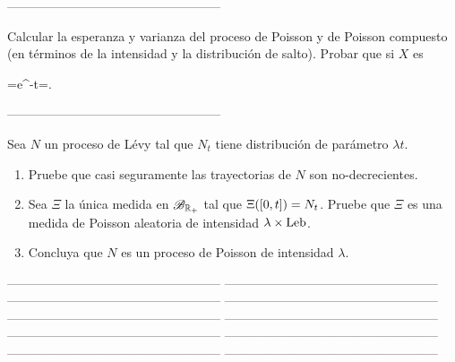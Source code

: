 \pn---------------------------------------------------\pn
\begin{ejercicio}
Calcular la esperanza y varianza del proceso de Poisson y de Poisson compuesto (en t\'erminos de la intensidad y la distribuci\'on de salto). Probar que si $X$ es\begin{esn}
=e^{-\lambda t}\quad{}\quad {}=. 
\end{esn}
\end{ejercicio}
\pn---------------------------------------------------\pn
\begin{ejercicio}
Sea $N$ un proceso de L\'evy tal que $N_t$ tiene distribuci\'on de par\'ametro $\lambda t$. 
\begin{enumerate}
\item Pruebe que casi seguramente las trayectorias de $N$ son no-decrecientes.
\item Sea $\Xi$ la \'unica medida en $\mathscr{B}_{\mathbb{R}_+}$ tal que $\Xi\!\left( [0,t]\right) =N_t$. Pruebe que $\Xi$ es una medida de Poisson aleatoria de intensidad $\lambda \times\text{Leb}$.
\item Concluya que $N$ es un proceso de Poisson de intensidad $\lambda$. 
\end{enumerate}
\end{ejercicio}
\pn---------------------------------------------------\pn
\pn---------------------------------------------------\pn
\pn---------------------------------------------------\pn
\pn---------------------------------------------------\pn
\pn---------------------------------------------------\pn
\pn---------------------------------------------------\pn
\pn---------------------------------------------------\pn
\pn---------------------------------------------------\pn
\pn---------------------------------------------------\pn
\pn---------------------------------------------------
\pn